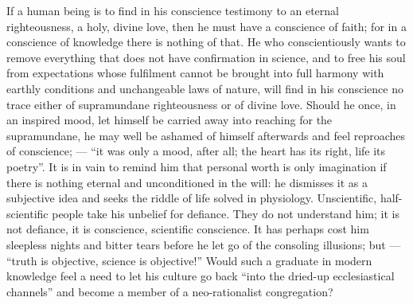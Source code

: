 \documentclass[12pt,a4paper,openany]{book}
\begin{document}
If a human being is to find in his conscience testimony
to an eternal righteousness, a holy, divine
love, then he must have a conscience of faith;
for in a conscience of knowledge there is nothing of that. He
who conscientiously wants to remove everything that does not
have confirmation in science, and to free his soul from
expectations whose fulfilment cannot be brought
into full harmony with earthly conditions and unchangeable
laws of nature, will find in his conscience no
trace either of supramundane righteousness or of
divine love. Should he once, in an inspired
mood, let himself be carried away into reaching for the
supramundane, he may well be ashamed of himself
afterwards and feel reproaches of conscience; --- ``it
was only a mood, after all; the heart has its right, life its
poetry''. It is in vain to remind him that
personal worth is only imagination if there is nothing
eternal and unconditioned in the will: he dismisses it
as a subjective idea and seeks the riddle of life solved in
physiology. Unscientific, half-scientific
people take his unbelief for defiance. They do not understand
him; it is not defiance, it is conscience,
scientific conscience. It has perhaps cost
him sleepless nights and bitter tears before he let
go of the consoling illusions; but --- ``truth
is objective, science is objective!'' Would such a
graduate in modern knowledge feel a need to
let his culture go back ``into the dried-up ecclesiastical
channels'' and become a member of a neo-rationalist
congregation?
\end{document}
